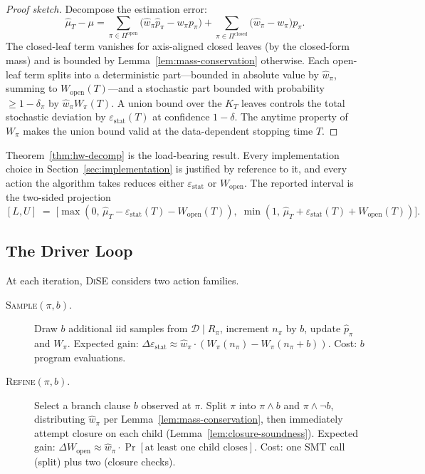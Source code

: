 \documentclass[runningheads]{llncs}
\providecommand{\Cref}[1]{Section~\ref{#1}}
\newcommand{\dist}{\mathcal{D}}
\newcommand{\mutrue}{\mu}
\newcommand{\muhat}{\hat{\mu}}
\newcommand{\partset}{\Pi}
\newcommand{\openleaves}{\partset^{\mathrm{open}}}
\newcommand{\closedleaves}{\partset^{\mathrm{closed}}}
\newcommand{\Wopen}{W_{\mathrm{open}}}
\newcommand{\epsstat}{\varepsilon_{\mathrm{stat}}}
\newcommand{\hwhat}{\hat{w}}
\newcommand{\hpathat}{\hat{p}}
\newcommand{\toolname}{\textsc{DiSE}}
\begin{document}
\begin{proof}[Proof sketch]
  Decompose the estimation error:
  \[
    \muhat_T - \mutrue
    = \sum_{\pi \in \openleaves}
        \!\bigl(\hwhat_\pi\hpathat_\pi - w_\pi p_\pi\bigr)
      + \sum_{\pi \in \closedleaves}
        \!\bigl(\hwhat_\pi - w_\pi\bigr)p_\pi.
  \]
  The closed-leaf term vanishes for axis-aligned closed leaves
  (by the closed-form mass) and is bounded by
  Lemma~\ref{lem:mass-conservation} otherwise.  Each open-leaf term
  splits into a deterministic part---bounded in absolute value by
  $\hwhat_\pi$, summing to $\Wopen(T)$---and a stochastic part
  bounded with probability $\ge 1-\delta_\pi$ by
  $\hwhat_\pi W_\pi(T)$.  A union bound over the $K_T$ leaves
  controls the total stochastic deviation by $\epsstat(T)$ at
  confidence $1-\delta$.  The anytime property of $W_\pi$ makes
  the union bound valid at the data-dependent stopping time $T$.
\end{proof}

Theorem~\ref{thm:hw-decomp} is the load-bearing result.  Every
implementation choice in \Cref{sec:implementation} is justified by
reference to it, and every action the algorithm takes reduces either
$\epsstat$ or $\Wopen$.  The reported interval is the two-sided
projection
\begin{equation}\label{eq:interval}
  [L, U] \;=\;
  \bigl[\max(0,\,\muhat_T - \epsstat(T) - \Wopen(T)),\;
        \min(1,\,\muhat_T + \epsstat(T) + \Wopen(T))\bigr].
\end{equation}

\subsection{The Driver Loop}\label{sec:asip-loop}

At each iteration, \toolname{} considers two action families.
\begin{description}
\item[\textsc{Sample}$(\pi, b)$.]
  Draw $b$ additional iid samples from $\dist \mid R_\pi$, increment
  $n_\pi$ by $b$, update $\hpathat_\pi$ and $W_\pi$.
  Expected gain: $\Delta\epsstat \approx \hwhat_\pi\cdot
  (W_\pi(n_\pi) - W_\pi(n_\pi+b))$.
  Cost: $b$ program evaluations.

\item[\textsc{Refine}$(\pi, b)$.]
  Select a branch clause $b$ observed at $\pi$.  Split $\pi$ into
  $\pi{\wedge}b$ and $\pi{\wedge}\neg b$, distributing $\hwhat_\pi$
  per Lemma~\ref{lem:mass-conservation}, then immediately attempt
  closure on each child (Lemma~\ref{lem:closure-soundness}).
  Expected gain: $\Delta\Wopen \approx \hwhat_\pi \cdot
  \Pr[\text{at least one child closes}]$.
  Cost: one SMT call (split) plus two (closure checks).
\end{description}
\end{document}
